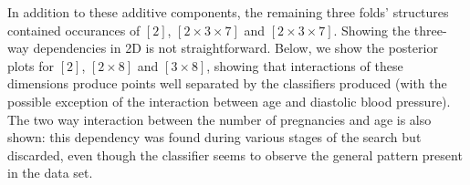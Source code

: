 \documentclass[a4paper,12pt ]{report}
\begin{document}
In addition to these additive components, the remaining three folds' structures contained occurances of $[2]$, $[2 \times 3 \times 7]$ and $ [ 2\times 3 \times7]$. Showing the three-way dependencies in 2D is not straightforward. Below, we show the posterior plots for 
$[2]$, $[2\times8]$ and $[3\times8]$, showing that interactions of these dimensions produce points well separated by the classifiers produced (with the possible exception of the interaction between age and diastolic blood pressure). The two way interaction between the number of pregnancies and age is also shown: this dependency was found during various 
stages of the search but discarded, even though the classifier seems to observe the general pattern present in the data set. 

\begin{center}
\end{center}
\end{document}

